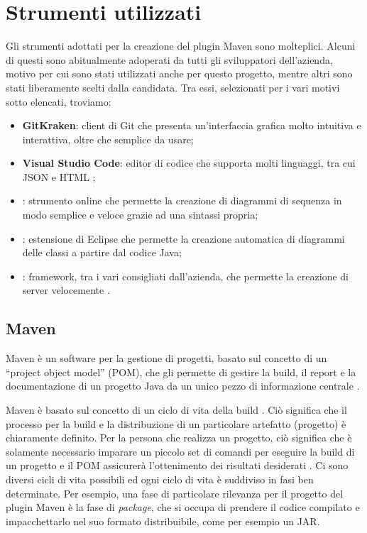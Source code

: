
\section{Strumenti utilizzati}
Gli strumenti adottati per la creazione del plugin Maven sono molteplici.
Alcuni di questi sono abitualmente adoperati da tutti gli sviluppatori dell'azienda, motivo per cui sono stati utilizzati anche per questo progetto, mentre altri sono stati liberamente scelti dalla candidata.
Tra essi, selezionati per i vari motivi sotto elencati, troviamo:
\begin{itemize}
    \item \textbf{GitKraken}: client di Git che presenta un'interfaccia grafica molto intuitiva e interattiva, oltre che semplice da usare;
    \item \textbf{Visual Studio Code}: editor di codice che supporta molti linguaggi, tra cui JSON e HTML \cite{site:visual-studio-code};
    \item {}: strumento online che permette la creazione di diagrammi di sequenza in modo semplice e veloce grazie ad una sintassi propria;
    \item {}: estensione di Eclipse che permette la creazione automatica di diagrammi delle classi a partire dal codice Java;
    \item {}: framework, tra i vari consigliati dall'azienda, che permette la creazione di server velocemente \cite{site:meecrowave}.
\end{itemize}

    \subsection{Maven} \label{mavenSection} %
        
    Maven è un software per la gestione di progetti, basato sul concetto di un ``project object model'' (POM), che gli permette di gestire la build, il report e la documentazione di un progetto Java da un unico pezzo di informazione centrale \cite{site:maven-introduzione}.

    Maven è basato sul concetto di un ciclo di vita della build .
    Ciò significa che il processo per la build e la distribuzione di un particolare artefatto (progetto) è chiaramente definito. 
    Per la persona che realizza un progetto, ciò significa che è solamente necessario imparare un piccolo set di comandi per eseguire la build di un progetto e il POM assicurerà l'ottenimento dei risultati desiderati \cite{site:maven-lifecycle}.
    Ci sono diversi cicli di vita possibili ed ogni ciclo di vita è suddiviso in fasi ben determinate.
    Per esempio, una fase di particolare rilevanza per il progetto del plugin Maven è la fase di \emph{package}, che si occupa di prendere il codice compilato e impacchettarlo nel suo formato distribuibile, come per esempio un JAR. 

